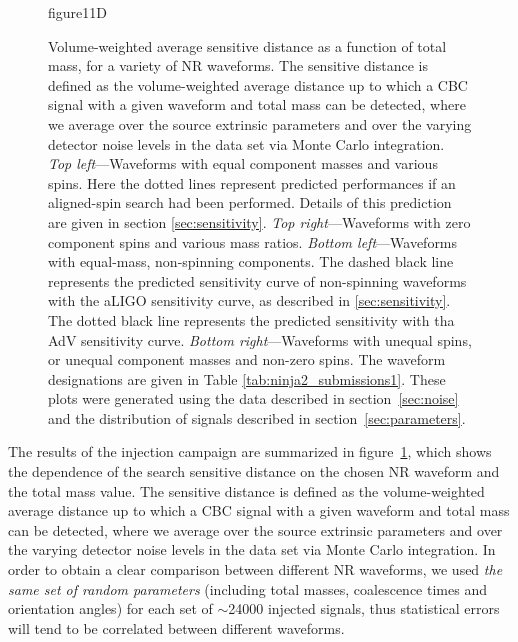 \documentclass[12pt]{iopart}
\begin{document}
\begin{figure}
{figure11D}
\caption{\label{fig:sens_dists_1}
Volume-weighted average sensitive distance as a function of total mass, for a 
variety of NR waveforms. The sensitive distance is defined as the 
volume-weighted average distance 
up to which a CBC signal with a given waveform and total mass can be detected, 
where we average over the source extrinsic parameters and over the varying 
detector noise levels in the data set via Monte Carlo integration.
\emph{Top left}---Waveforms with equal component masses and various spins. Here 
the dotted lines represent predicted performances if an aligned-spin search had 
been performed. Details of this prediction are given in section 
\ref{sec:sensitivity}.
\emph{Top right}---Waveforms with zero component spins and various mass ratios.
\emph{Bottom left}---Waveforms with equal-mass, non-spinning components. The 
dashed black line represents the predicted sensitivity curve of non-spinning 
waveforms with the aLIGO sensitivity curve, as described in 
\ref{sec:sensitivity}. The dotted black line represents the predicted 
sensitivity with tha AdV sensitivity curve.
\emph{Bottom right}---Waveforms with unequal spins, or unequal component masses 
and non-zero spins.
The waveform designations are given in Table 
\ref{tab:ninja2_submissions1}. These plots were generated using the data 
described in section~\ref{sec:noise} and the distribution of signals described 
in section~\ref{sec:parameters}.}
\end{figure}

The results of the injection campaign are summarized in 
figure~\ref{fig:sens_dists_1}, which shows the dependence of the search
sensitive distance on the chosen NR waveform and the total mass value. 
The sensitive distance is defined as the volume-weighted average distance 
up to which a CBC signal with a given waveform and total mass can be detected, 
where we average over the source extrinsic parameters and over the varying 
detector noise levels in the data set via Monte Carlo integration. 
In order to obtain a clear comparison between different NR waveforms, we used
\emph{the same set of random parameters} (including total masses, coalescence
times and orientation angles) for each set of $\sim$24000 injected signals, thus
statistical errors will tend to be correlated between different waveforms.
 
\end{document}
